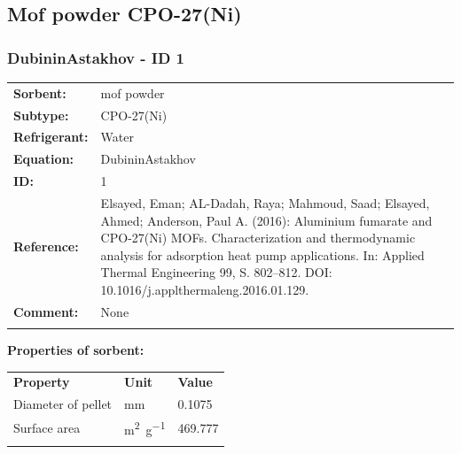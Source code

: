 \subsection{Mof powder CPO-27(Ni)}
%
\subsubsection{DubininAstakhov - ID 1}
%
\begin{tabular}[l]{|lp{11.5cm}|}
\hline
\addlinespace

\textbf{Sorbent:} & mof powder \\
\textbf{Subtype:} & CPO-27(Ni) \\
\textbf{Refrigerant:} & Water \\
\textbf{Equation:} & DubininAstakhov \\
\textbf{ID:} & 1 \\
\textbf{Reference:} & Elsayed, Eman; AL-Dadah, Raya; Mahmoud, Saad; Elsayed, Ahmed; Anderson, Paul A. (2016): Aluminium fumarate and CPO-27(Ni) MOFs. Characterization and thermodynamic analysis for adsorption heat pump applications. In: Applied Thermal Engineering 99, S. 802–812. DOI: 10.1016/j.applthermaleng.2016.01.129. \\
\textbf{Comment:} & None \\

\addlinespace
\hline
\end{tabular}
\newline

\textbf{Properties of sorbent:}
\newline
%
\begin{longtable}[l]{lll}
\toprule
\addlinespace
\textbf{Property} & \textbf{Unit} & \textbf{Value} \\
\addlinespace
\midrule
\endhead
\bottomrule
\endfoot
\bottomrule
\endlastfoot
\addlinespace

Diameter of pellet & \si{\milli\meter} & 0.1075\\
Surface area & \si{\square\meter\per\gram} & 469.777\\

\addlinespace\end{longtable}

